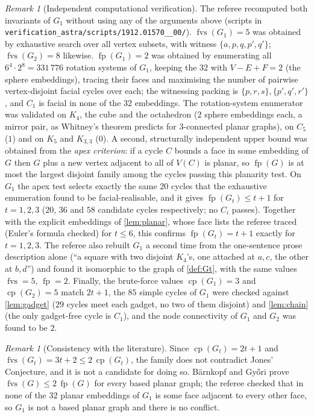 \documentclass[11pt,a4paper]{article}
\theoremstyle{plain}
\theoremstyle{definition}
\theoremstyle{remark}
\newtheorem{remark}[theorem]{Remark}
\newcommand{\fvs}{\operatorname{fvs}}
\newcommand{\cp}{\operatorname{cp}}
\newcommand{\fp}{\operatorname{fp}}
\newcommand{\Gtt}{G_t}
\begin{document}
\begin{remark}[Independent computational verification]\label{rem:computation}
The referee recomputed both invariants of $G_1$ without using any of the arguments above (scripts in \texttt{verification\_astra/scripts/1912.01570\_\_00/}). $\fvs(G_1)=5$ was obtained by exhaustive search over all vertex subsets, with witness $\{a,p,q,p',q'\}$; $\fvs(G_2)=8$ likewise. $\fp(G_1)=2$ was obtained by enumerating all $6^4\cdot2^8=331\,776$ rotation systems of $G_1$, keeping the $32$ with $V-E+F=2$ (the sphere embeddings), tracing their faces and maximising the number of pairwise vertex-disjoint facial cycles over each; the witnessing packing is $\{p,r,s\},\{p',q',r'\}$, and $C_1$ is facial in none of the $32$ embeddings. The rotation-system enumerator was validated on $K_4$, the cube and the octahedron ($2$ sphere embeddings each, a mirror pair, as Whitney's theorem \cite{Whitney32} predicts for $3$-connected planar graphs), on $C_5$ ($1$) and on $K_5$ and $K_{3,3}$ ($0$). A second, structurally independent upper bound was obtained from the \emph{apex criterion}: if a cycle $C$ bounds a face in some embedding of $G$ then $G$ plus a new vertex adjacent to all of $V(C)$ is planar, so $\fp(G)$ is at most the largest disjoint family among the cycles passing this planarity test. On $G_1$ the apex test selects exactly the same $20$ cycles that the exhaustive enumeration found to be facial-realisable, and it gives $\fp(\Gtt)\le t+1$ for $t=1,2,3$ ($20$, $36$ and $58$ candidate cycles respectively; no $C_i$ passes). Together with the explicit embeddings of \cref{lem:planar}, whose face lists the referee traced (Euler's formula checked) for $t\le6$, this confirms $\fp(\Gtt)=t+1$ exactly for $t=1,2,3$. The referee also rebuilt $G_1$ a second time from the one-sentence prose description alone (``a square with two disjoint $K_4$'s, one attached at $a,c$, the other at $b,d$'') and found it isomorphic to the graph of \cref{def:Gt}, with the same values $\fvs=5$, $\fp=2$. Finally, the brute-force values $\cp(G_1)=3$ and $\cp(G_2)=5$ match $2t+1$, the $85$ simple cycles of $G_1$ were checked against \cref{lem:gadget} ($29$ cycles meet each gadget, no two of them disjoint) and \cref{lem:chain} (the only gadget-free cycle is $C_1$), and the node connectivity of $G_1$ and $G_2$ was found to be $2$.
\end{remark}

\begin{remark}[Consistency with the literature]\label{rem:consistency}
Since $\cp(\Gtt)=2t+1$ and $\fvs(\Gtt)=3t+2\le2\,\cp(\Gtt)$, the family does not contradict Jones' Conjecture, and it is not a candidate for doing so. Bärnkopf and Győri \cite[Remark~2.5]{BG24} prove $\fvs(G)\le2\,\fp(G)$ for every based planar graph; the referee checked that in none of the $32$ planar embeddings of $G_1$ is some face adjacent to every other face, so $G_1$ is not a based planar graph and there is no conflict.
\end{remark}
\end{document}
